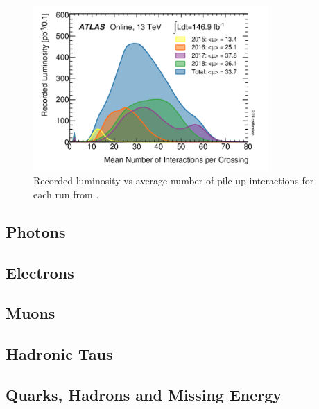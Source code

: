 \begin{figure}
\centering
    \includegraphics[width=0.8\textwidth]{images/Luminosity_vs_Pileup.png}
    \caption{Recorded luminosity vs average number of pile-up interactions for each run from 
    \cite{atlas-run3-setup}.}
    \label{fig:Luminosity_vs_Pileup}
\end{figure}

\subsection{Photons}

\subsection{Electrons}

\subsection{Muons}

\subsection{Hadronic Taus}

\subsection{Quarks, Hadrons and Missing Energy}
